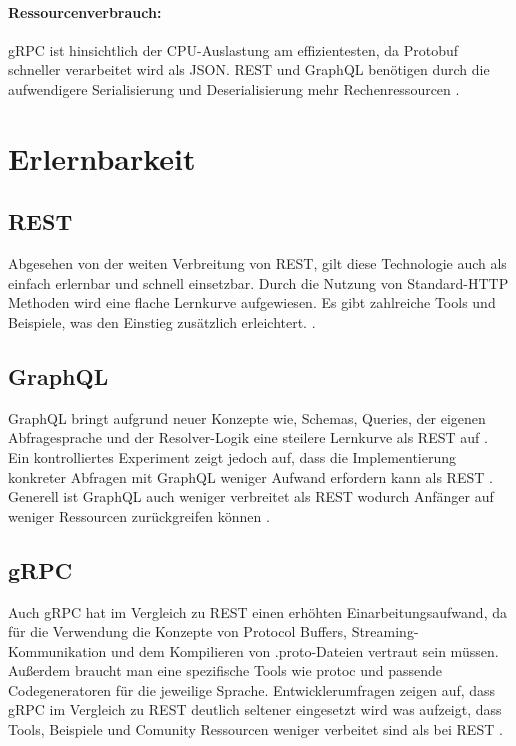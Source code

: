 \paragraph{Ressourcenverbrauch:}  
gRPC ist hinsichtlich der CPU-Auslastung am effizientesten, da Protobuf schneller verarbeitet wird als JSON. REST und GraphQL benötigen durch die aufwendigere Serialisierung und Deserialisierung mehr Rechenressourcen \parencite{Niswar2024PerformanceEvaluation,BergRedi2023Benchmarking}.

\section{Erlernbarkeit}

\subsection{REST}
Abgesehen von der weiten Verbreitung von REST, gilt diese Technologie auch als einfach erlernbar und schnell einsetzbar. Durch die Nutzung von Standard-HTTP Methoden wird eine flache Lernkurve aufgewiesen. Es gibt zahlreiche Tools und Beispiele, was den Einstieg zusätzlich erleichtert. \parencite{redhat-apiguide,postman2023}.

\subsection{GraphQL}
GraphQL bringt aufgrund neuer Konzepte wie, Schemas, Queries, der eigenen Abfragesprache und der Resolver-Logik eine steilere Lernkurve als REST auf \parencite{redhat-apiguide}.
Ein kontrolliertes Experiment zeigt jedoch auf, dass die Implementierung konkreter Abfragen mit GraphQL weniger Aufwand erfordern kann als REST \parencite{brito2020graphqlrest}. Generell ist GraphQL auch weniger verbreitet als REST wodurch Anfänger auf weniger Ressourcen zurückgreifen können
 \parencite{postman2023}.

\subsection{gRPC}

Auch gRPC hat im Vergleich zu REST einen erhöhten Einarbeitungsaufwand, da für die Verwendung die Konzepte von Protocol Buffers, Streaming-Kommunikation und dem Kompilieren von .proto-Dateien vertraut sein müssen. Außerdem braucht man eine spezifische Tools wie protoc und passende Codegeneratoren für die jeweilige Sprache. Entwicklerumfragen  zeigen auf, dass gRPC im Vergleich zu REST deutlich seltener eingesetzt wird was aufzeigt, dass Tools, Beispiele und Comunity Ressourcen weniger verbeitet sind als bei REST \parencite{redhat-apiguide,gRPCAbout}.



\chapterend